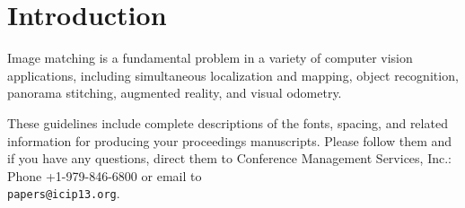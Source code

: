 
\section{Introduction}
\label{sec:intro}

Image matching is a fundamental problem in a variety of computer vision applications, including simultaneous localization and mapping\cite{Chang2007PSlam,Davison2007Monoslam}, object recognition\cite{Nister2006Scalable}, panorama stitching\cite{Brown2003Recognising,Wagner2010RealTimeb}, augmented reality\cite{Klein2007Parallel,Wagner2009Multiple}, and visual odometry\cite{Cheng2006Visual,Nister2004Visual}. 

These guidelines include complete descriptions of the fonts, spacing, and
related information for producing your proceedings manuscripts. Please follow
them and if you have any questions, direct them to Conference Management
Services, Inc.: Phone +1-979-846-6800 or email
to \\\texttt{papers@icip13.org}.
